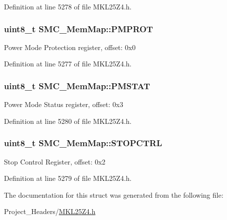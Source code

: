 Definition at line 5278 of file M\+K\+L25\+Z4.\+h.

\subsubsection[{\texorpdfstring{P\+M\+P\+R\+OT}{PMPROT}}]{\setlength{\rightskip}{0pt plus 5cm}uint8\+\_\+t S\+M\+C\+\_\+\+Mem\+Map\+::\+P\+M\+P\+R\+OT}\hypertarget{struct_s_m_c___mem_map_afd03d93a7823dc65f53216dca15a2a95}{}\label{struct_s_m_c___mem_map_afd03d93a7823dc65f53216dca15a2a95}
Power Mode Protection register, offset\+: 0x0 

Definition at line 5277 of file M\+K\+L25\+Z4.\+h.

\subsubsection[{\texorpdfstring{P\+M\+S\+T\+AT}{PMSTAT}}]{\setlength{\rightskip}{0pt plus 5cm}uint8\+\_\+t S\+M\+C\+\_\+\+Mem\+Map\+::\+P\+M\+S\+T\+AT}\hypertarget{struct_s_m_c___mem_map_a0fddef87e229c4cf1b3be0d29589e964}{}\label{struct_s_m_c___mem_map_a0fddef87e229c4cf1b3be0d29589e964}
Power Mode Status register, offset\+: 0x3 

Definition at line 5280 of file M\+K\+L25\+Z4.\+h.

\subsubsection[{\texorpdfstring{S\+T\+O\+P\+C\+T\+RL}{STOPCTRL}}]{\setlength{\rightskip}{0pt plus 5cm}uint8\+\_\+t S\+M\+C\+\_\+\+Mem\+Map\+::\+S\+T\+O\+P\+C\+T\+RL}\hypertarget{struct_s_m_c___mem_map_a3065a98baea0fc4c0099b9782554a662}{}\label{struct_s_m_c___mem_map_a3065a98baea0fc4c0099b9782554a662}
Stop Control Register, offset\+: 0x2 

Definition at line 5279 of file M\+K\+L25\+Z4.\+h.



The documentation for this struct was generated from the following file\+:\begin{DoxyCompactItemize}
\item 
Project\+\_\+\+Headers/\hyperlink{_m_k_l25_z4_8h}{M\+K\+L25\+Z4.\+h}\end{DoxyCompactItemize}
